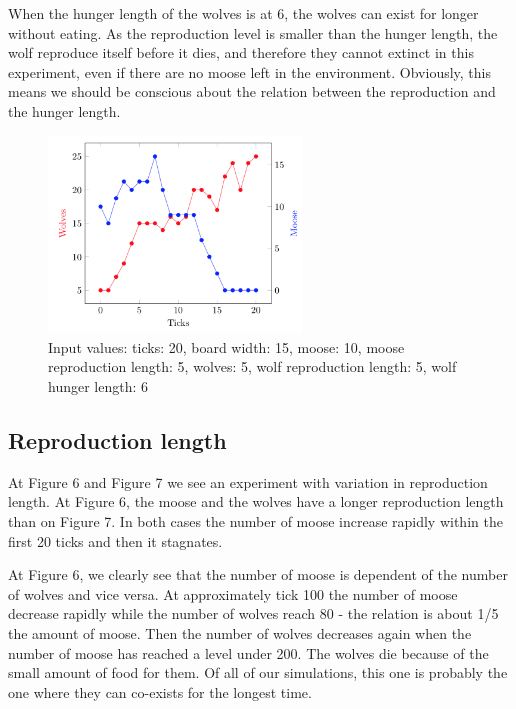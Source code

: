 \documentclass[a4paper]{report}
\begin{document}
When the hunger length of the wolves is at 6, the wolves can exist for longer without eating. As the reproduction level is smaller than the hunger length, the wolf reproduce itself before it dies, and therefore they cannot extinct in this experiment, even if there are no moose left in the environment. Obviously, this means we should be conscious about the relation between the reproduction and the hunger length.

\begin{figure}[H]
\centering
\includegraphics[width=0.60\textwidth]{Experiments/sim_hunlen_a2}
\caption{Input values: ticks: 20, board width: 15, moose: 10, moose reproduction length: 5, wolves: 5, wolf reproduction length: 5, wolf hunger length: 6}
\end{figure}


\subsection{Reproduction length}
At Figure 6 and Figure 7 we see an experiment with variation in reproduction length. At Figure 6, the moose and the wolves have a longer reproduction length than on Figure 7. In both cases the number of moose increase rapidly within the first 20 ticks and then it stagnates.
 
At Figure 6, we clearly see that the number of moose is dependent of the number of wolves and vice versa. At approximately tick 100 the number of moose decrease rapidly while the number of wolves reach 80 - the relation is about 1/5 the amount of moose. Then the number of wolves decreases again when the number of moose has reached a level under 200. The wolves die because of the small amount of food for them. \newline 
Of all of our simulations, this one is probably the one where they can co-exists for the longest time.
\end{document}
